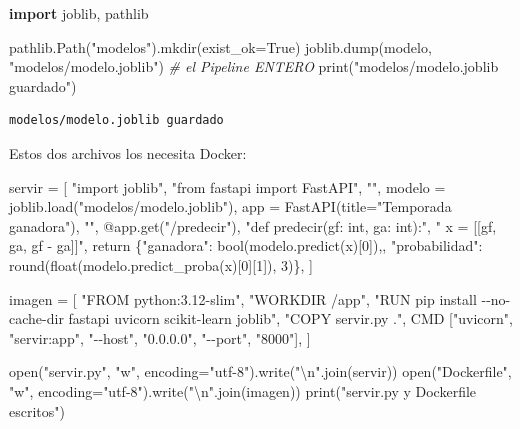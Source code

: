 \documentclass[
]{article}
\newenvironment{Shaded}{}{}
\newcommand{\BuiltInTok}[1]{\textcolor[rgb]{0.00,0.50,0.00}{#1}}
\newcommand{\CharTok}[1]{\textcolor[rgb]{0.25,0.44,0.63}{#1}}
\newcommand{\CommentTok}[1]{\textcolor[rgb]{0.38,0.63,0.69}{\textit{#1}}}
\newcommand{\ImportTok}[1]{\textcolor[rgb]{0.00,0.50,0.00}{\textbf{#1}}}
\newcommand{\NormalTok}[1]{#1}
\newcommand{\OperatorTok}[1]{\textcolor[rgb]{0.40,0.40,0.40}{#1}}
\newcommand{\StringTok}[1]{\textcolor[rgb]{0.25,0.44,0.63}{#1}}
\newcommand{\VariableTok}[1]{\textcolor[rgb]{0.10,0.09,0.49}{#1}}
\begin{document}
\protect{}\label{37580302}
\begin{Shaded}
\begin{Highlighting}[]
\ImportTok{import}\NormalTok{ joblib, pathlib}

\NormalTok{pathlib.Path(}\StringTok{"modelos"}\NormalTok{).mkdir(exist\_ok}\OperatorTok{=}\VariableTok{True}\NormalTok{)}
\NormalTok{joblib.dump(modelo, }\StringTok{"modelos/modelo.joblib"}\NormalTok{)     }\CommentTok{\# el Pipeline ENTERO}
\BuiltInTok{print}\NormalTok{(}\StringTok{"modelos/modelo.joblib guardado"}\NormalTok{)}
\end{Highlighting}
\end{Shaded}

\begin{verbatim}
modelos/modelo.joblib guardado
\end{verbatim}

\protect{}\label{6fffec23}
Estos dos archivos los necesita Docker:

\protect{}\label{70e31cdf}
\begin{Shaded}
\begin{Highlighting}[]
\NormalTok{servir }\OperatorTok{=}\NormalTok{ [}
    \StringTok{"import joblib"}\NormalTok{,}
    \StringTok{"from fastapi import FastAPI"}\NormalTok{,}
    \StringTok{""}\NormalTok{,}
    \StringTok{\textquotesingle{}modelo = joblib.load("modelos/modelo.joblib")\textquotesingle{}}\NormalTok{,}
    \StringTok{\textquotesingle{}app = FastAPI(title="Temporada ganadora")\textquotesingle{}}\NormalTok{,}
    \StringTok{""}\NormalTok{,}
    \StringTok{\textquotesingle{}@app.get("/predecir")\textquotesingle{}}\NormalTok{,}
    \StringTok{"def predecir(gf: int, ga: int):"}\NormalTok{,}
    \StringTok{"    x = [[gf, ga, gf {-} ga]]"}\NormalTok{,}
    \StringTok{\textquotesingle{}    return \{"ganadora": bool(modelo.predict(x)[0]),\textquotesingle{}}\NormalTok{,}
    \StringTok{\textquotesingle{}            "probabilidad": round(float(modelo.predict\_proba(x)[0][1]), 3)\}\textquotesingle{}}\NormalTok{,}
\NormalTok{]}

\NormalTok{imagen }\OperatorTok{=}\NormalTok{ [}
    \StringTok{"FROM python:3.12{-}slim"}\NormalTok{,}
    \StringTok{"WORKDIR /app"}\NormalTok{,}
    \StringTok{"RUN pip install {-}{-}no{-}cache{-}dir fastapi uvicorn scikit{-}learn joblib"}\NormalTok{,}
    \StringTok{"COPY servir.py ."}\NormalTok{,}
    \StringTok{\textquotesingle{}CMD ["uvicorn", "servir:app", "{-}{-}host", "0.0.0.0", "{-}{-}port", "8000"]\textquotesingle{}}\NormalTok{,}
\NormalTok{]}

\BuiltInTok{open}\NormalTok{(}\StringTok{"servir.py"}\NormalTok{, }\StringTok{"w"}\NormalTok{, encoding}\OperatorTok{=}\StringTok{"utf{-}8"}\NormalTok{).write(}\StringTok{"}\CharTok{\textbackslash{}n}\StringTok{"}\NormalTok{.join(servir))}
\BuiltInTok{open}\NormalTok{(}\StringTok{"Dockerfile"}\NormalTok{, }\StringTok{"w"}\NormalTok{, encoding}\OperatorTok{=}\StringTok{"utf{-}8"}\NormalTok{).write(}\StringTok{"}\CharTok{\textbackslash{}n}\StringTok{"}\NormalTok{.join(imagen))}
\BuiltInTok{print}\NormalTok{(}\StringTok{"servir.py y Dockerfile escritos"}\NormalTok{)}
\end{Highlighting}
\end{Shaded}
\end{document}
